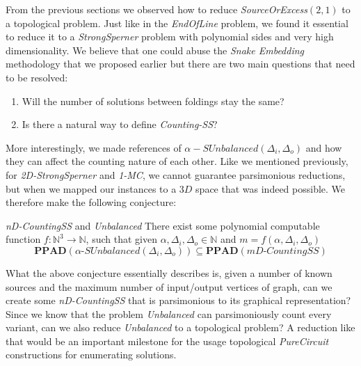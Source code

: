From the previous sections we observed how to reduce \textit{SourceOrExcess}$(2,1)$ to a topological problem.
Just like in the \textit{EndOfLine} problem, we found it essential to reduce it to a \textit{StrongSperner} problem
with polynomial sides and very high dimensionality. We believe that one could abuse the \textit{Snake Embedding} methodology
that we proposed earlier but there are two main questions that need to be resolved:
\begin{enumerate}
    \item Will the number of solutions between foldings stay the same?
    \item Is there a natural way to define \textit{Counting-SS}?
\end{enumerate}
More interestingly, we made references of $\alpha-\textit{SUnbalanced}(\Delta_i, \Delta_o)$
and how they can affect the counting nature of each other. Like we mentioned previously, for
\textit{2D-StrongSperner} and \textit{1-MC}, we cannot guarantee parsimonious reductions, but
when we mapped our instances to a $3D$ space that was indeed possible. We therefore make the following conjecture:

\begin{conjecturebox}{\textit{nD-CountingSS} and \textit{Unbalanced}}{}
    There exist some polynomial computable function $f :\mathbb{N}^3 \to \mathbb{N}$, such that
    given $\alpha,\Delta_i, \Delta_o \in \mathbb{N}$ and $m= f(\alpha, \Delta_i, \Delta_o)$
    $$
        \textbf{PPAD}(\alpha\textit{-SUnbalanced}(\Delta_i, \Delta_o)) \subseteq
        \textbf{PPAD}(m\textit{D-CountingSS})
    $$
\end{conjecturebox}
What the above conjecture essentially describes is, given a number of known sources and the
maximum number of input/output vertices of graph, can we create some \textit{nD-CountingSS}
that is parsimonious to its graphical representation? Since we know that the problem \textit{Unbalanced}
can parsimoniously count every variant, can we also reduce \textit{Unbalanced} to a topological
problem? A reduction like that would be an important milestone for the usage topological \textit{PureCircuit} constructions
for enumerating solutions.